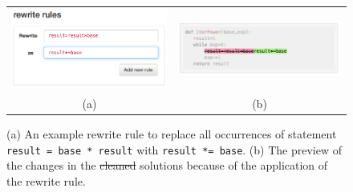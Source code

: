 \documentclass[12pt,twoside]{mitthesis}
\newcommand \codevar[1]{\texttt{#1}}
\providecommand{\DIFaddtex}[1]{{\protect\color{blue}\uwave{#1}}} %
\providecommand{\DIFdeltex}[1]{{\protect\color{red}\sout{#1}}}                      %
\providecommand{\DIFaddFL}[1]{\DIFadd{#1}} %
\providecommand{\DIFdelFL}[1]{\DIFdel{#1}} %
\providecommand{\DIFaddbeginFL}{} %
\providecommand{\DIFaddendFL}{} %
\providecommand{\DIFdelbeginFL}{} %
\providecommand{\DIFdelendFL}{} %
\providecommand{\DIFadd}[1]{\texorpdfstring{\DIFaddtex{#1}}{#1}} %
\providecommand{\DIFdel}[1]{\texorpdfstring{\DIFdeltex{#1}}{}} %
\begin{document}
{{{{{{{{{{\begin{figure}[htpb]
\begin{tabular}{c | c}
\begin{minipage}{.5\linewidth}
\centering
\includegraphics[scale=0.45]{Body/figures/overcode/rewriteRuleScreenshot.png}
\end{minipage}
&
\begin{minipage}{.5\linewidth}
\centering
\includegraphics[scale=0.40]{Body/figures/overcode/rewritePreviewScreenShot.png}
\end{minipage}
\\
(a) & (b)
\end{tabular}
\caption{(a) An example rewrite rule to replace all occurrences of statement \codevar{result = base * result} with \codevar{result *= base}. (b) The preview of the changes in the \DIFdelbeginFL \DIFdelFL{cleaned }\DIFdelendFL \DIFaddbeginFL \DIFaddFL{platonic }\DIFaddendFL solutions because of the application of the rewrite rule.}
\label{rewriterule}
\end{figure}

}}}}}}}}}}
\end{document}
